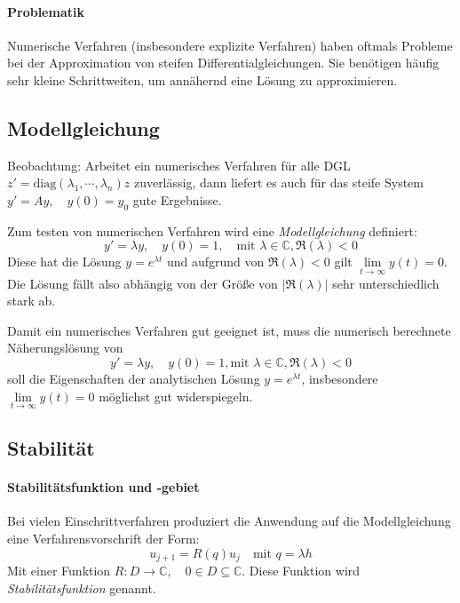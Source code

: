 \documentclass[a4paper, 11pt, accentcolor = tud3b]{tudreport}
\newcommand{\abs}[1]{\ensuremath{{\lvert #1 \rvert}}}
\newcommand{\C}{\ensuremath{\mathbb{C}}}
\begin{document}
	        \paragraph{Problematik}
		        Numerische Verfahren (insbesondere explizite Verfahren) haben oftmals Probleme bei der Approximation von steifen Differentialgleichungen. Sie benötigen häufig sehr kleine Schrittweiten, um annähernd eine Lösung zu approximieren.
	
	        \subsection{Modellgleichung}
	            Beobachtung: Arbeitet ein numerisches Verfahren für alle DGL \( z' = \textrm{diag}(\lambda_1, \cdots, \lambda_n)z \) zuverlässig, dann liefert es auch für das steife System \( y' = Ay, \quad y(0) = y_0 \) gute Ergebnisse.
	            
	            Zum testen von numerischen Verfahren wird eine \textit{Modellgleichung} definiert:
	            \begin{equation*}
		            y' = \lambda y, \quad y(0) = 1, \quad \textrm{mit } \lambda \in \C, \Re(\lambda) < 0
	            \end{equation*}
	            Diese hat die Lösung \( y = e^{\lambda t} \) und aufgrund von \( \Re(\lambda) < 0 \) gilt \( \lim\limits_{t \rightarrow \infty} y(t) = 0 \). Die Lösung fällt also abhängig von der Größe von \(\abs{\Re(\lambda)}\) sehr unterschiedlich stark ab.
	            
	            Damit ein numerisches Verfahren gut geeignet ist, muss die numerisch berechnete Näherungslösung von
            	\begin{equation*}
	            	y' = \lambda y, \quad y(0) = 1, \textrm{mit } \lambda \in \C, \Re(\lambda) < 0
            	\end{equation*}
            	soll die Eigenschaften der analytischen Lösung \( y = e^{\lambda t} \), insbesondere \( \lim\limits_{t \rightarrow \infty} y(t) = 0 \) möglichst gut widerspiegeln.
	
	        \subsection{Stabilität}
		        \paragraph{Stabilitätsfunktion und -gebiet}
			        Bei vielen Einschrittverfahren produziert die Anwendung auf die Modellgleichung eine Verfahrensvorschrift der Form:
			        \begin{equation*}
				        u_{j+1} = R(q)u_j \quad \textrm{mit } q = \lambda h
			        \end{equation*}
			        Mit einer Funktion \( R : D \rightarrow \C, \quad 0 \in D \subseteq \C \). Diese Funktion wird \textit{Stabilitätsfunktion} genannt.
			        
\end{document}

